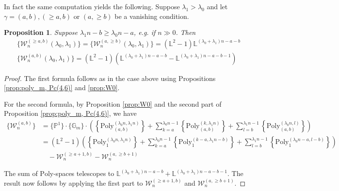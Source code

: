 \documentclass[a4paper,12pt]{amsart}
\newtheorem{prop}[thm]{Proposition}
\theoremstyle{definition}
\newcommand{\bL}{\mathbb{L}}
\newcommand{\cW}{\mathcal{W}}
\newcommand{\Pb}{\mathbb{P}}
\newcommand{\Gb}{\mathbb{G}}
\begin{document}
	
	In fact the same computation yields the following. Suppose $\lambda_1 > \lambda_0$ and let $\gamma = (a,b), (\geq a, b)$ or $(a, \geq b)$ be a vanishing condition. 
	
	\begin{prop}\label{prop:(a,b)counts} Suppose $\lambda_1n - b \geq \lambda_0n - a$, e.g. if $n \gg 0$. Then 
		\begin{align*}
			&\{\cW_n^{(\geq a, b)}(\lambda_0, \lambda_1)\} = \{\cW_n^{(a, \geq b)}(\lambda_0, \lambda_1)\} = (\bL^2 - 1)\bL^{(\lambda_0 + \lambda_1)n - a - b} \\
			&\{\cW_n^{(a,b)}(\lambda_0, \lambda_1)\} = (\bL^2 - 1)\left(\bL^{(\lambda_0 + \lambda_1)n - a - b} - \bL^{(\lambda_0 + \lambda_1)n - a - b - 1}\right)
		\end{align*}
	\end{prop}
	
	\begin{proof} The first formula follows as in the case above using Propositions \ref{prop:poly_m, Pc(4,6)} and \ref{prop:W0}. 
		
		For the second formula, by Proposition \ref{prop:W0} and the second part of Proposition \ref{prop:poly_m, Pc(4,6)}, we have
		\begin{align*}
			\{\cW^{(a,b)}_n\} &= \{\Pb^1\} \cdot \{\Gb_m\} \cdot \left(\left\{\mathrm{Poly}_{(a,b)}^{(\lambda_0n,\lambda_1n)}\right\}+\sum_{k=a}^{\lambda_0n-1}\left\{\mathrm{Poly}_{(a,b)}^{(k,\lambda_1n)}\right\}+\sum_{l=b}^{\lambda_1n-1}\left\{\mathrm{Poly}_{(a,b)}^{(\lambda_0n,l)}\right\}\right) \\ 
			&= (\bL^2 - 1)\left(\left\{\mathrm{Poly}_1^{(\lambda_0n, \lambda_1n)}\right\} + \sum_{k = a}^{\lambda_0n -1} \left\{\mathrm{Poly}_1^{(k - a, \lambda_1n - b)}\right\} + \sum_{l = b}^{\lambda_1n - 1} \left\{\mathrm{Poly}_1^{(\lambda_0n - a, l - b)}\right\}\right) \\
			&\quad - \cW_n^{(\geq a +1, b)} - \cW_n^{(a, \geq b + 1)}
		\end{align*}
		
		The sum of $\mathrm{Poly}$-spaces telescopes to $\bL^{(\lambda_0 + \lambda_1)n - a - b} + \bL^{(\lambda_0 + \lambda_1)n - a- b - 1}$. The result now follows by applying the first part to $\cW_n^{(\geq a + 1, b)}$ and $\cW_n^{(a, \geq b + 1)}$. 
		
		
		
	\end{proof}
	
	
	
\end{document}
